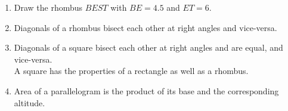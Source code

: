 \begin{enumerate}[label=\arabic*.,ref=\thesubsection.\theenumi]
\item Draw the rhombus $BEST$ with $BE = 4.5$ and $ET = 6$. 
\\
\solution 
%
%
\item  Diagonals of a rhombus bisect each other at right angles and vice-versa. 
%
%
\item  Diagonals of a square bisect each other at right angles and are equal, and vice-versa. 
%
\\
\solution A square has the properties of a rectangle as well as a rhombus.
%
%
\item Area of a parallelogram is the product of its base and the corresponding altitude. 
%
\end{enumerate}
